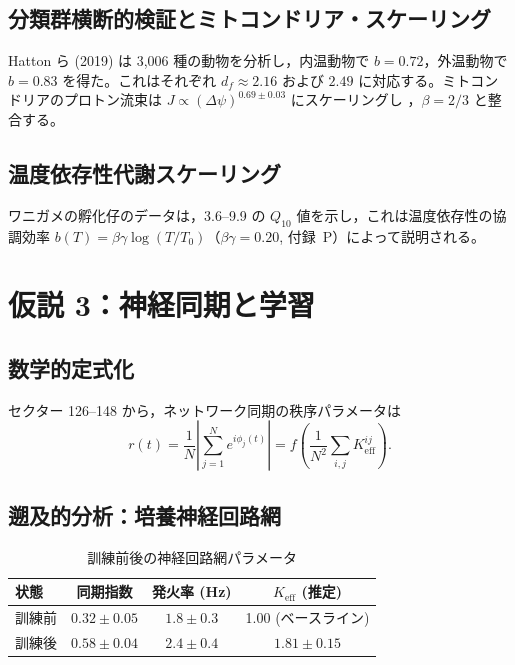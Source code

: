 \documentclass[11pt,a4paper]{article}
\begin{document}
	\subsection{分類群横断的検証とミトコンドリア・スケーリング}
	
	Hatton ら (2019) は 3,006 種の動物を分析し，内温動物で \(b=0.72\)，外温動物で \(b=0.83\) を得た。これはそれぞれ \(d_f \approx 2.16\) および \(2.49\) に対応する。ミトコンドリアのプロトン流束は \(J \propto (\Delta \psi)^{0.69 \pm 0.03}\) にスケーリングし \cite{West2023}，\(\beta=2/3\) と整合する。
	
	\subsection{温度依存性代謝スケーリング}
	
	ワニガメの孵化仔のデータは，3.6--9.9 の \(Q_{10}\) 値を示し，これは温度依存性の協調効率 \(b(T) = \beta\gamma \log(T/T_0)\)（\(\beta\gamma = 0.20\), 付録~P）によって説明される。
	
	\section{仮説 3：神経同期と学習}
	
	\subsection{数学的定式化}
	
	セクター 126--148 から，ネットワーク同期の秩序パラメータは
	\begin{equation}
		r(t) = \frac{1}{N}\left|\sum_{j=1}^N e^{i\phi_j(t)}\right| = f\left(\frac{1}{N^2}\sum_{i,j} K_{\text{eff}}^{ij}\right).
		\label{eq:sync_order}
	\end{equation}
	
	\subsection{遡及的分析：培養神経回路網}
	
	\begin{table}[H]
		\centering
		\caption{訓練前後の神経回路網パラメータ \cite{PLOS2025b}}
		\label{tab:neural-training}
		\begin{tabular}{lccc}
			\toprule
			\textbf{状態} & \textbf{同期指数} & \textbf{発火率 (Hz)} & \(K_{\text{eff}}\) (推定) \\
			\midrule
			訓練前 & \(0.32 \pm 0.05\) & \(1.8 \pm 0.3\) & 1.00 (ベースライン) \\
			訓練後 & \(0.58 \pm 0.04\) & \(2.4 \pm 0.4\) & \(1.81 \pm 0.15\) \\
			\bottomrule
		\end{tabular}
	\end{table}
	
\end{document}
